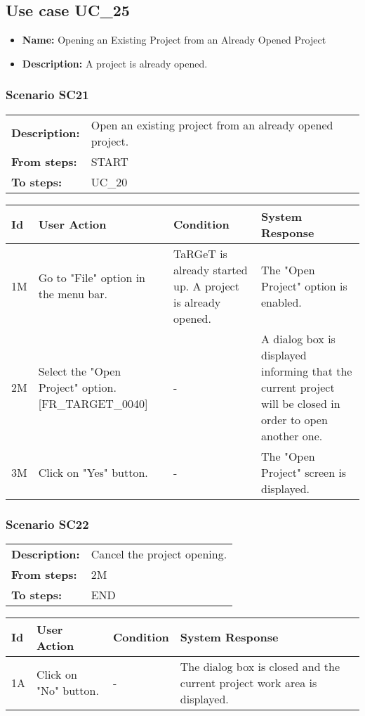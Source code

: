 \documentclass[a4paper,11pt]{article}
\newcommand{\bl}{\\ \hline}
\begin{document}
\subsection*{Use case UC_25}
\begin{itemize}
\item {\bf Name: }Opening an Existing Project from an Already Opened Project
			
\item {\bf Description: }A project is already opened.
\end{itemize}
\subsubsection*{Scenario SC21}
\begin{tabular}{p{1in}p{4in}}
{\bf Description:} & Open an existing project from an already opened
					project. \\
{\bf From steps:} & START \\
{\bf To steps:} & UC_20#3M \\
\end{tabular}
 
\begin{tabular}{|p{0.8in}|p{1.6in}|p{1.6in}|p{1.6in}|}
\hline
Id & User Action & Condition & System Response  \bl 
1M & Go to "File" option in the menu bar.   & TaRGeT is already started up. A project is already
						opened. &  The "Open Project" option is enabled.  \bl 
2M & Select the "Open Project" option. [FR_TARGET_0040]  & - & A dialog box is displayed informing that the current
						project will be closed in order to open another one.  \bl 
3M & Click on "Yes" button. & - & The "Open Project" screen is displayed.  \bl 
\end{tabular}
\subsubsection*{Scenario SC22}
\begin{tabular}{p{1in}p{4in}}
{\bf Description:} & Cancel the project opening. \\
{\bf From steps:} & 2M \\
{\bf To steps:} & END \\
\end{tabular}
 
\begin{tabular}{|p{0.8in}|p{1.6in}|p{1.6in}|p{1.6in}|}
\hline
Id & User Action & Condition & System Response  \bl 
1A & Click on "No" button. & - & The dialog box is closed and the current project work
						area is displayed. \bl 
\end{tabular}
\end{document}
